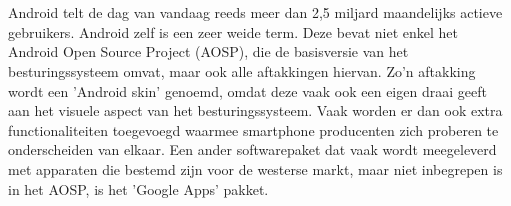 
%
%

%



\chapter*{}

Android telt de dag van vandaag reeds meer dan 2,5 miljard maandelijks actieve gebruikers. Android zelf is een zeer weide term. Deze bevat niet enkel het Android Open Source Project (AOSP), die de basisversie van het besturingssysteem omvat, maar ook alle aftakkingen hiervan. Zo'n aftakking wordt een 'Android skin' genoemd, omdat deze vaak ook een eigen draai geeft aan het visuele aspect van het besturingssysteem. Vaak worden er dan ook extra functionaliteiten toegevoegd waarmee smartphone producenten zich proberen te onderscheiden van elkaar. Een ander softwarepaket dat vaak wordt meegeleverd met apparaten die bestemd zijn voor de westerse markt, maar niet inbegrepen is in het AOSP, is het 'Google Apps' pakket.

